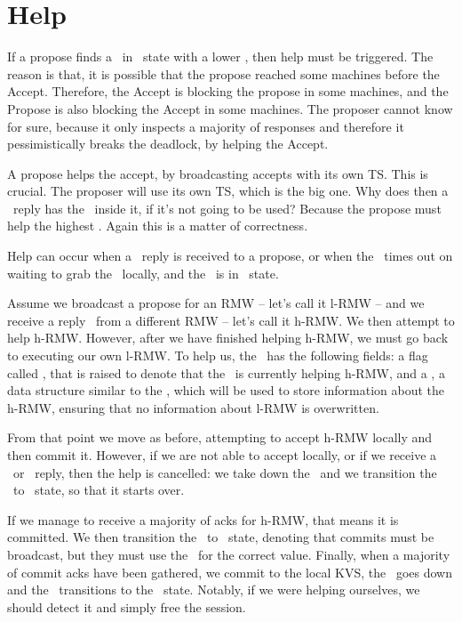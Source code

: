 \section{Help} \label{sec:help}

If a propose finds a \kv~in \acced~state with a lower \accts, then help must be triggered. The reason is that, it is possible that the propose reached some machines before the Accept. Therefore, the Accept is blocking the propose in some machines, and the Propose is also blocking the Accept in some machines. The proposer cannot know for sure, because it only inspects a majority of responses and therefore it pessimistically breaks the deadlock, by helping the Accept.

A propose helps the accept, by broadcasting accepts with its own TS. This is crucial. The proposer will use its own TS, which is the big one. Why does then a \lowacc~reply has the \accts~inside it, if it's not going to be used? Because the propose must help the highest \accts. Again this is a matter of correctness.


Help can occur when a \lowacc~reply is received to a propose, or when the \locentry~times out on waiting to grab the \kv~locally, and the \kv~is in \acced~state.

\custvspace
{}
Assume we broadcast a propose for an RMW -- let's call it l-RMW -- and we receive a reply \lowacc~from a different RMW -- let's call it h-RMW. We then attempt to help h-RMW. However, after we have finished helping h-RMW, we must go back to executing our own l-RMW.
To help us, the \locentry~has the following fields: a flag called \helpflag, that is raised to denote that the \locentry~is currently helping h-RMW, and a \helploc, a data structure similar to the \locentry, which will be used to store information about the h-RMW, ensuring that no information about l-RMW is overwritten.

From that point we move as before, attempting to accept h-RMW locally and then commit it.
However, if we are not able to accept locally, or if we receive a \highprop~or \highacc~reply, then the help is cancelled: we take down the \helpflag~and we transition the \locentry~to \need~state, so that it starts over.

If we manage to receive a majority of acks for h-RMW, that means it is committed. We then transition the \locentry~to \bcasthelp~state, denoting that commits must be broadcast, but they must use the \helploc~for the correct value. Finally, when a majority of commit acks have been gathered, we commit to the local KVS, the \helpflag~goes down and the \locentry~transitions to the \need~state. Notably, if we were helping ourselves, we should detect it and simply free the session.

